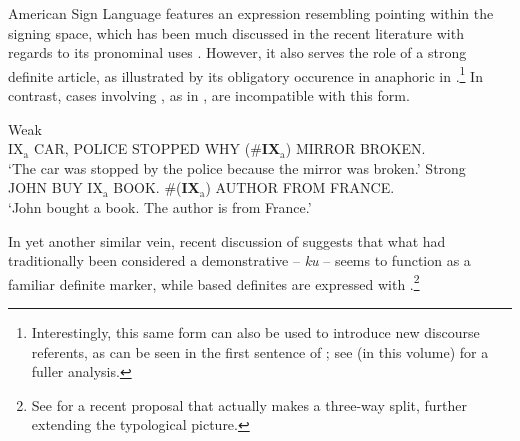 \documentclass[output=paper
,modfonts
,nonflat]{langscibook}
\begin{document}
American Sign Language features an expression resembling pointing
within the signing space, which has been much discussed in the recent literature with regards
to its pronominal uses 
\citep{Schlenker2017}. However, it also serves the role of a strong
definite article, as illustrated by its obligatory occurence in
anaphoric  in .\footnote{Interestingly, this
  same form can also be used to introduce new discourse referents, as
  can be seen in the first sentence of ; see
  \citet{Irani2017} (in this volume) for a fuller analysis.} In contrast, cases
involving  , as in , are
incompatible with this form.

\begin{exe}
\ex\label{ex:schwarz:17} 
\begin{xlist}
\ex\label{ex:Schwarz:17a} Weak\\ IX$_\text{a}$ CAR, POLICE STOPPED WHY (\#\textbf{IX}$_\text{a}$) {MIRROR} BROKEN. \\
‘The car was stopped by the police because the mirror was broken.’ 
\ex\label{ex:schwarz17b} Strong\\ JOHN BUY IX$_\text{a}$ BOOK. \#(\textbf{IX}$_\text{a}$) {AUTHOR} FROM FRANCE.\\
   ‘John bought a book. The author is from France.’
\end{xlist}

\end{exe}

In yet another similar vein, recent discussion of  suggests that
what had traditionally been considered a demonstrative -- \textit{ku}
 -- seems to
function as a familiar definite marker, while  based
definites are expressed with .\footnote{See
  \citet{Ahn2017} for a recent proposal that  actually makes a
  three-way split, further extending the typological picture.}
\end{document}
